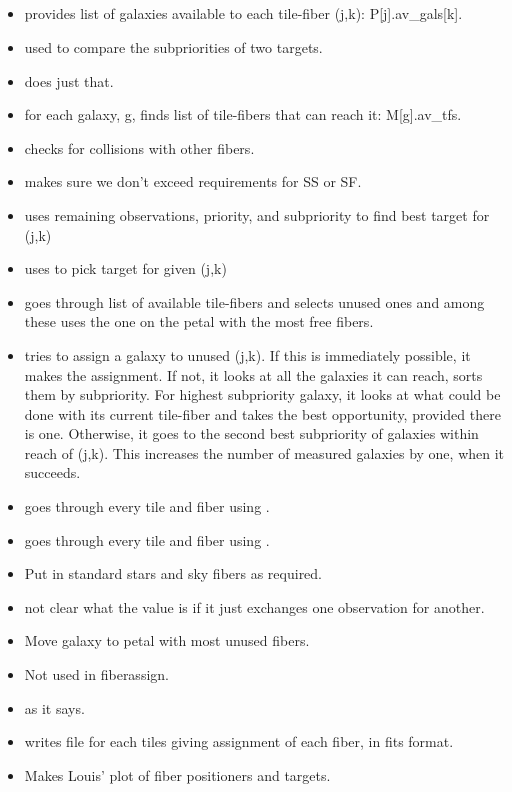 \documentclass[12pt]{article}
\begin{document}
\subsection{}
\begin{itemize}
\item {} provides list of galaxies available to each tile-fiber (j,k): P[j].av\_gals[k].
\item{} used to compare the subpriorities of two targets.
\item{} does just that.
\item{} for each galaxy, g, finds list of tile-fibers that can reach it: M[g].av\_tfs.
\item{} checks for collisions with other fibers.
\item{} makes sure we don't exceed requirements for SS or SF.
\item{}uses remaining observations, priority, and subpriority to find best target for (j,k)
\item{} uses  to pick target for given (j,k)
\item{} goes through list of available tile-fibers and selects unused ones and among these uses the one on the petal with the most free fibers.
\item{}tries to assign a galaxy to unused (j,k).  If this is immediately possible, it makes the assignment.  If not, it looks at all the galaxies it can reach, sorts them by subpriority.  For highest subpriority galaxy, it looks at what could be done with its current tile-fiber and takes the best opportunity, provided there is one. Otherwise, it goes to the second best subpriority of galaxies within reach of (j,k).  This increases the number of measured galaxies by one, when it succeeds.
\item{}goes through every tile and fiber using .
\item{}goes through every tile and fiber using .

\item{}Put in standard stars and sky fibers as required.
\item{}not clear what the value is if it just exchanges one observation for another.
\item{}Move galaxy to petal with most unused fibers.
\item{}Not used in fiberassign.
\item{} as it says.
\item{}writes file for each tiles giving assignment of each fiber, in fits format.
\item{} Makes Louis' plot of fiber positioners and targets.
\end{itemize}
\end{document}

